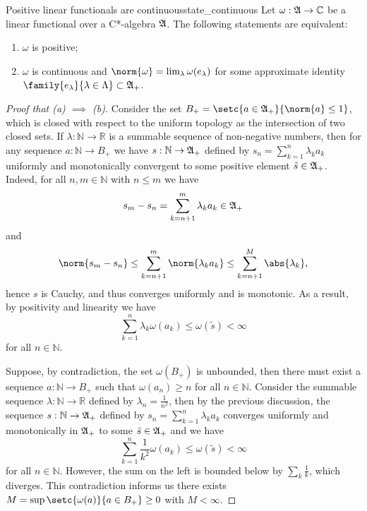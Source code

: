\begin{proposition}{Positive linear functionals are continuous}{state_continuous}
    Let \(\omega : \mathfrak{A} \to \mathbb{C}\) be a linear functional over a C*-algebra \(\mathfrak{A}\). The following statements are equivalent:
    \begin{enumerate}[label=(\alph*)]
        \item \(\omega\) is positive;
        \item \(\omega\) is continuous and \(\norm{\omega} = \lim_{\lambda} \omega(e_{\lambda})\) for some approximate identity \(\family{e_{\lambda}}{\lambda \in \Lambda} \subset \algebra{A}_+\).
    \end{enumerate}
\end{proposition}
\begin{proof}[Proof that (a) \(\implies\) (b)]
    Consider the set \(B_+ = \setc{a \in \algebra{A}_+}{\norm{a} \leq 1}\), which is closed with respect to the uniform topology as the intersection of two closed sets. If \(\lambda : \mathbb{N} \to \mathbb{R}\) is a summable sequence of non-negative numbers, then for any sequence \(a : \mathbb{N} \to B_+\) we have \(s : \mathbb{N} \to \mathfrak{A}_+\) defined by \(s_n = \sum_{k = 1}^{n}\lambda_k a_k\) uniformly and monotonically convergent to some positive element \(\tilde{s} \in \mathfrak{A}_+\). Indeed, for all \(n, m \in \mathbb{N}\) with \(n \leq m\) we have
    \begin{equation*}
        s_m - s_n = \sum_{k=n+1}^m \lambda_k a_k \in \mathfrak{A}_+
    \end{equation*}
    and
    \begin{equation*}
        \norm{s_m - s_n} \leq \sum_{k = n+1}^m \norm{\lambda_k a_k} \leq \sum_{k = n+1}^M \abs{\lambda_k},
    \end{equation*}
    hence \(s\) is Cauchy, and thus converges uniformly and is monotonic. As a result, by positivity and linearity we have
    \begin{equation*}
        \sum_{k = 1}^{n} \lambda_k \omega(a_k) \leq \omega(\tilde{s}) < \infty
    \end{equation*}
    for all \(n \in \mathbb{N}\).

    Suppose, by contradiction, the set \(\omega(B_+)\) is unbounded, then there must exist a sequence \(a : \mathbb{N} \to B_+\) such that \(\omega(a_n) \geq n\) for all \(n \in \mathbb{N}\). Consider the summable sequence \(\lambda : \mathbb{N} \to \mathbb{R}\) defined by \(\lambda_n = \frac1{n^2}\), then by the previous discussion, the sequence \(s : \mathbb{N} \to \mathfrak{A}_+\) defined by \(s_n = \sum_{k = 1}^{n} \lambda_k a_k\) converges uniformly and monotonically in \(\mathfrak{A}_+\) to some \(\tilde{s} \in \mathfrak{A}_+\) and we have
    \begin{equation*}
        \sum_{k = 1}^{n} \frac{1}{k^2} \omega(a_k) \leq \omega(\tilde{s}) < \infty
    \end{equation*}
    for all \(n \in \mathbb{N}\). However, the sum on the left is bounded below by \(\sum_{k} \frac1k\), which diverges. This contradiction informs us there exists \(M = \sup{\setc{\omega(a)}{a \in B_+}} \geq 0\) with \(M < \infty\).


\end{proof}
